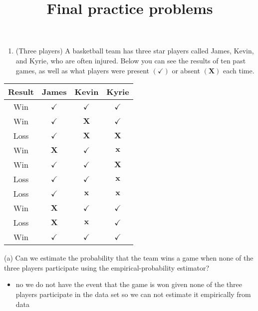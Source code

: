 \documentclass[10pt]{article}
\title{Final practice problems }
\author{}
\date{}
\begin{document}
\maketitle
\begin{enumerate}
  \item (Three players) A basketball team has three star players called James, Kevin, and Kyrie, who are often injured. Below you can see the results of ten past games, as well as what players were present $(\boldsymbol{\checkmark})$ or absent $(\boldsymbol{X})$ each time.
\end{enumerate}

\begin{center}
\begin{tabular}{|c|c|c|c|}
\hline
Result & James & Kevin & Kyrie \\
\hline
Win & $\checkmark$ & $\checkmark$ & $\checkmark$ \\
\hline
Win & $\checkmark$ & $\boldsymbol{X}$ & $\checkmark$ \\
\hline
Loss & $\checkmark$ & $\boldsymbol{X}$ & $\boldsymbol{X}$ \\
\hline
Win & $\boldsymbol{X}$ & $\checkmark$ & $\boldsymbol{x}$ \\
\hline
Win & $\checkmark$ & $\checkmark$ & $\boldsymbol{X}$ \\
\hline
Loss & $\checkmark$ & $\checkmark$ & $\boldsymbol{x}$ \\
\hline
Loss & $\checkmark$ & $\boldsymbol{x}$ & $\boldsymbol{x}$ \\
\hline
Win & $\boldsymbol{X}$ & $\checkmark$ & $\checkmark$ \\
\hline
Loss & $\boldsymbol{X}$ & $\boldsymbol{x}$ & $\checkmark$ \\
\hline
Win & $\checkmark$ & $\checkmark$ & $\checkmark$ \\
\hline
\end{tabular}
\end{center}

(a) Can we estimate the probability that the team wins a game when none of the three players participate using the empirical-probability estimator?
\begin{itemize}
    \item no we do not have the event that the game is won given none of the three players participate in the data set so we can not estimate it empirically from data 
\end{itemize}
\end{document}
